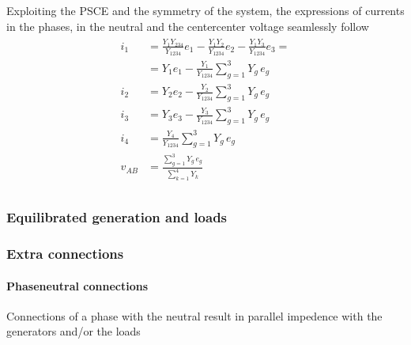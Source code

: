 \documentclass[letterpaper,10pt,italian]{jupyterBook}
\begin{document}
\sphinxAtStartPar
{} Exploiting the PSCE and the symmetry of the system, the expressions of currents in the phases, in the neutral and the center\sphinxhyphen{}center voltage seamlessly follow
\begin{equation*}
\begin{split}\begin{aligned}
  i_1    & = \frac{Y_1 Y_{234}}{Y_{1234}} e_1 - \frac{Y_1 Y_2}{Y_{1234}} e_2 - \frac{Y_1 Y_3}{Y_{1234}} e_3 = \\
         & = Y_1 e_1 - \frac{Y_1}{Y_{1234}} \sum_{g=1}^{3} Y_g \, e_g \\
  i_2    & = Y_2 e_2 - \frac{Y_2}{Y_{1234}} \sum_{g=1}^{3} Y_g \, e_g \\
  i_3    & = Y_3 e_3 - \frac{Y_3}{Y_{1234}} \sum_{g=1}^{3} Y_g \, e_g \\
  i_4    & = \frac{Y_4}{Y_{1234}} \sum_{g=1}^{3} Y_g \, e_g \\
  v_{AB} & =  \frac{\sum_{g=1}^{3} Y_g \, e_g}{\sum_{k=1}^4 Y_k} \\
\end{aligned}\end{split}
\end{equation*}

\subsubsection{Equilibrated generation and loads}
\label{\detokenize{ch/electrical-engineering-three-phase:equilibrated-generation-and-loads}}

\subsubsection{Extra connections}
\label{\detokenize{ch/electrical-engineering-three-phase:extra-connections}}

\paragraph{Phase\sphinxhyphen{}neutral connections}
\label{\detokenize{ch/electrical-engineering-three-phase:phase-neutral-connections}}
\sphinxAtStartPar
Connections of a phase with the neutral result in parallel impedence with the generators and/or the loads

\begin{figure}[htbp]
\centering

\noindent{}
\end{figure}
\end{document}
